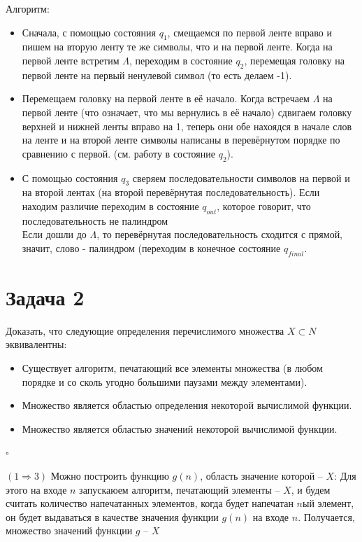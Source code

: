 \documentclass[a4paper,12pt]{article} %
\begin{document}
Алгоритм:
\begin{itemize}
\item Сначала, с помощью состояния $q_1$, смещаемся по первой ленте вправо и пишем на вторую ленту те же символы, что и на первой ленте. Когда на первой ленте встретим $\Lambda$, переходим в состояние $q_2$, перемещая головку на первой ленте на первый ненулевой символ (то есть делаем -1).

\item Перемещаем головку на первой ленте в её начало. Когда встречаем $\Lambda$ на первой ленте (что означает, что мы вернулись в её начало) сдвигаем головку верхней и нижней ленты вправо на 1, теперь они обе нахоядся в начале слов на ленте и на второй ленте символы написаны в перевёрнутом порядке по сравнению с первой. (см. работу в состояние $q_2$).

\item С помощью состояния $q_3$ сверяем последовательности символов на первой и на второй лентах (на второй перевёрнутая последовательность). Если находим различие переходим в состояние $q_{out}$, которое говорит, что последовательность не палиндром\\
Если дошли до $\Lambda$, то перевёрнутая последовательность сходится с прямой, значит, слово - палиндром (переходим в конечное состояние $q_{final}$.
\end{itemize}


\section*{Задача 2}
Доказать, что следующие определения перечислимого множества $X \subset {N}$ эквивалентны:
\begin{itemize}
\item Существует алгоритм, печатающий все элементы множества (в любом порядке и со сколь угодно большими паузами между элементами).
\item Множество является областью определения некоторой вычислимой функции.
\item Множество является областью значений некоторой вычислимой функции.
\end{itemize}
$\square$

$(1\Rightarrow3)$
 Можно построить функцию $g(n)$, область значение которой -- $ X $:
Для этого на входе $ n $ запускаюем алгоритм, печатающий элементы -- $ X $, и будем считать количество напечатанных элементов, когда будет напечатан $ n $ый элемент, он будет выдаваться в качестве значения функции $g(n)$ на входе $ n $. Получается, множество значений функции $g$ -- $ X $\\
\end{document}
